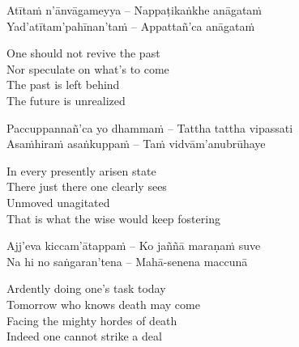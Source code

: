 \begin{verses}
  Atītaṁ n'ānvāgameyya – Nappaṭikaṅkhe anāgataṁ\\
  Yad'atītam'pahīnan'taṁ – Appattañ'ca anāgataṁ
\end{verses}

\begin{english-verses}
  One should not revive the past\\
  Nor speculate on what's to come\\
  The past is left behind\\
  The future is unrealized
\end{english-verses}

\begin{verses}
  Paccuppannañ'ca yo dhammaṁ – Tattha tattha vipassati\\
  Asaṁhiraṁ asaṅkuppaṁ – Taṁ vidvā\ifdigitalversion\makeatletter\hyperlink{endnote156-appendix}\fi m'anubrūhaye
\end{verses}



\begin{english-verses}
  In every presently arisen state\\
  There just there one clearly sees\\
  Unmoved unagitated\\
  That is what the wise would keep fostering\ifdigitalversion\makeatletter\hyperlink{endnote43-appendix}\makeatother\fi
\end{english-verses}

\begin{verses}
  Ajj'eva kiccam'ātappaṁ – Ko jaññā maraṇaṁ suve\\
  Na hi no saṅgaran'tena – Mahā-senena maccunā
\end{verses}

\begin{english-verses}
  Ardently doing one's task today\\
  Tomorrow who knows death may come\\
  Facing the mighty hordes of death\\
  Indeed one cannot strike a deal
\end{english-verses}

